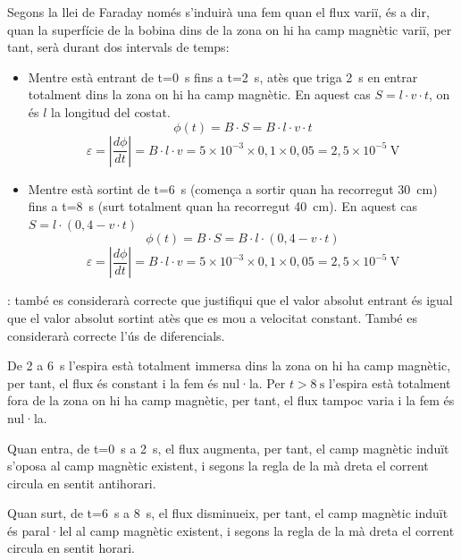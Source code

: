 \begin{solapartat}
 Segons la llei de Faraday només s'induirà una fem quan el flux variï, és a dir, quan la superfície de la bobina dins de la zona on hi ha camp magnètic variï, per tant, serà durant dos intervals de temps:
\begin{itemize}
  \item Mentre està entrant de t=0~s fins a t=2~s, atès que triga 2~s en entrar totalment dins la zona on hi ha camp magnètic. En aquest cas $S = l\cdot v\cdot t$, on és $l$ la longitud del costat.
  \[ \phi(t) = B\cdot S = B\cdot l\cdot v\cdot t \]
  \[ \varepsilon = \left|\frac{d\phi}{dt}\right| = B\cdot l\cdot v = 5\times 10^{-3}\times 0,1\times 0,05 = 2,5\times 10^{-5}\ \mathrm{V} \]
  \item Mentre està sortint de t=6~s (comença a sortir quan ha recorregut 30~cm) fins a t=8~s (surt totalment quan ha recorregut 40~cm). En aquest cas $S = l\cdot(0,4 - v\cdot t)$
  \[ \phi(t) = B\cdot S = B\cdot l\cdot(0,4 - v\cdot t) \]
  \[ \varepsilon = \left|\frac{d\phi}{dt}\right| = B\cdot l\cdot v = 5\times 10^{-3}\times 0,1\times 0,05 = 2,5\times 10^{-5}\ \mathrm{V} \]
\end{itemize}
: també es considerarà correcte que justifiqui que el valor absolut entrant és igual que el valor absolut sortint atès que es mou a velocitat constant. També es considerarà correcte l'ús de diferencials.

 De 2 a 6~s l'espira està totalment immersa dins la zona on hi ha camp magnètic, per tant, el flux és constant i la fem és nul·la. Per $t > 8\ \mathrm{s}$ l'espira està totalment fora de la zona on hi ha camp magnètic, per tant, el flux tampoc varia i la fem és nul·la.


 Quan entra, de t=0~s a 2~s, el flux augmenta, per tant, el camp magnètic induït s'oposa al camp magnètic existent, i segons la regla de la mà dreta el corrent circula en sentit antihorari.


 Quan surt, de t=6~s a 8~s, el flux disminueix, per tant, el camp magnètic induït és paral·lel al camp magnètic existent, i segons la regla de la mà dreta el corrent circula en sentit horari.

\end{solapartat}
